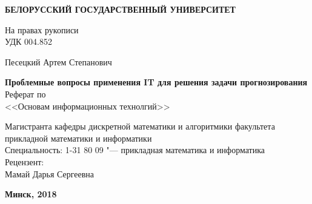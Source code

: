 \begin{titlepage}
    \begin{center}
      \textbf{ БЕЛОРУССКИЙ ГОСУДАРСТВЕННЫЙ УНИВЕРСИТЕТ}
    \end{center}
    
    \vspace{2em}
	\begin{flushleft}
		На правах рукописи \hspace{16em} \\
		УДК 004.852
	\end{flushleft}
	
	\vspace{2em}
	\begin{center}
		Песецкий Артем Степанович
	\end{center}
	\begin{center}
        {\bf Проблемные вопросы применения IT для решения задачи прогнозирования} \\
        \vspace{5mm}
        {Реферат по \\
        <<Основам информационных технолгий>>}
    \end{center}
	
	\vspace{2em}
	
	\hfill 
	\begin{minipage}{0.5\linewidth}
		Магистранта кафедры дискретной математики и алгоритмики факультета прикладной математики и информатики \\[0.5em]
		
		Специальность: 1-31 80 09 "--- прикладная математика и информатика \\[0.5em]
		
		Рецензент: \\
		Мамай Дарья Сергеевна
	\end{minipage}

    \vspace{8em}

    
    \vfill

    \begin{center}
        {\large \bf Минск, 2018}
    \end{center}
\end{titlepage}
